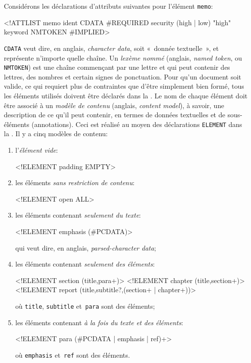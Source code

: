 \hspace*{-7pt}Considérons les déclarations d'attributs suivantes pour
l'élément \texttt{memo}:
\begin{sverb}
<!ATTLIST memo ident      CDATA          #REQUIRED
               security   (high | low)   "high"
               keyword    NMTOKEN        #IMPLIED>
\end{sverb}
\texttt{CDATA} veut dire, en anglais, \emph{character data}, soit
«~donnée textuelle~», et représente n'importe quelle chaîne. Un
\emph{lexème nommé} (anglais, \emph{named token}, ou \texttt{NMTOKEN})
est une chaîne commençant par une lettre et qui peut contenir des
lettres, des nombres et certain signes de ponctuation. Pour qu'un
document soit valide, ce qui requiert plus de contraintes que d'être
simplement bien formé, tous les éléments utilisés doivent être
déclarés dans la \DTD. Le nom de chaque élément doit être associé à un
\emph{modèle de contenu} (anglais, \emph{content model}), à savoir,
une description de ce qu'il peut contenir, en termes de données
textuelles et de sous-éléments (annotations). Ceci est réalisé au
moyen des déclarations \texttt{ELEMENT} dans la \DTD. Il y a cinq
modèles de contenu:
\begin{enumerate}

  \item l'\emph{élément vide}:
\begin{sverb}
<!ELEMENT padding EMPTY>
\end{sverb}

  \item les éléments \emph{sans restriction de contenu}:
\begin{sverb}
<!ELEMENT open ALL>
\end{sverb}

  \item les éléments contenant \emph{seulement du texte}:
\begin{sverb}
<!ELEMENT emphasis (#PCDATA)>
\end{sverb}
qui veut dire, en anglais, \emph{parsed-character data};

\bigskip

  \item les éléments contenant \emph{seulement des éléments}:
\begin{sverb}
<!ELEMENT section (title,para+)>
<!ELEMENT chapter (title,section+)>
<!ELEMENT report (title,subtitle?,(section+ | chapter+))>
\end{sverb}
où \texttt{title}, \texttt{subtitle} et~\texttt{para} sont des
éléments;

\bigskip

\item les éléments contenant \emph{à la fois du texte et des
    éléments}:
\begin{sverb}
<!ELEMENT para (#PCDATA | emphasis | ref)+>
\end{sverb}
où \texttt{emphasis} et~\texttt{ref} sont des éléments.
\end{enumerate}
